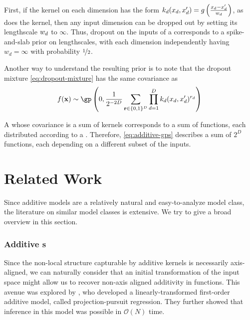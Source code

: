 First, if the kernel on each dimension has the form ${k_d(x_d, x_d') = g \left( \frac{x_d - x_d'}{w_d} \right)}$, as does the \kSE{} kernel, then any input dimension can be dropped out by setting its lengthscale $w_d$ to $\infty$.
Thus, dropout on the inputs of a \gp{} corresponds to a spike-and-slab prior on lengthscales, with each dimension independently having $w_d = \infty$ with probability $\nicefrac{1}{2}$.

Another way to understand the resulting prior is to note that the dropout mixture \eqref{eq:dropout-mixture} has the same covariance as
\begin{align}
f(\vx) \sim \textnormal{\gp} \left(0, \frac{1}{2^{-2D}} \sum_{\vr \in \{0,1\}^D}  \prod_{d=1}^D k_d(x_d, x_d')^{r_d} \right)
\label{eq:additive-gps}
\end{align}

A \gp{} whose covariance is a sum of kernels corresponds to a sum of functions, each distributed according to a \gp{}.  Therefore, \eqref{eq:additive-gps} describes a sum of $2^D$ functions, each depending on a different subset of the inputs.



\section{Related Work}

Since additive models are a relatively natural and easy-to-analyze model class, the literature on similar model classes is extensive.
We try to give a broad overview in this section.

\subsubsection{Additive \sgp{}s}

Since the non-local structure capturable by additive kernels is necessarily axis-aligned, we can naturally consider that an initial transformation of the input space might allow us to recover non-axis aligned additivity in functions.
This avenue was explored by \citet{gilboa2013scaling}, who developed a linearly-transformed first-order additive \gp{} model, called projection-pursuit \gp{} regression.  They further showed that inference in this model was possible in $\mathcal{O}(N)$ time.

